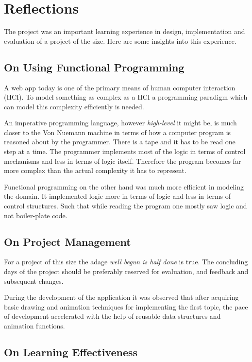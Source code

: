 \section{Reflections}

The project was an important learning experience in design, implementation and
evaluation of a project of the size. Here are some insights into this experience.

\subsection{On Using Functional Programming} 
\label{reflection: functional}

A web app today is one of the primary means of human computer interaction
(HCI). To model something as complex as a HCI a programming paradigm which can
model this complexity efficiently is needed. 

An imperative programming language, however \emph{high-level} it might be, is
much closer to the Von Nuemann machine in terms of how a computer program is
reasoned about by the programmer. There is a tape and it has to be read one
step at a time. The programmer implements most of the logic in terms of control
mechanisms and less in terms of logic itself. Therefore the program becomes far
more complex than the actual complexity it has to represent. 

Functional programming on the other hand was much more efficient in modeling
the domain. It implemented logic more in terms of logic and less in terms of
control structures. Such that while reading the program one mostly saw logic
and not boiler-plate code.

\subsection{On Project Management}
For a project of this size the adage \emph{well begun is half done} is true.
The concluding days of the project should be preferably reserved for
evaluation, and feedback and subsequent changes.

During the development of the application it was observed that after acquiring
basic drawing and animation techniques for implementing the first topic, the
pace of development accelerated with the help of reusable data structures and
animation functions.

\subsection{On Learning Effectiveness}

